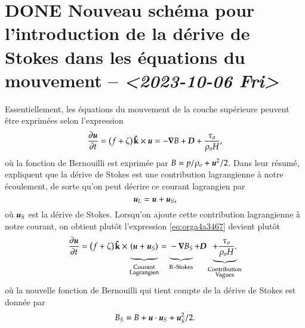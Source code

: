 \documentclass[10pt]{article}
\numberwithin{equation}{section}
\newcommand{\kvf}{\vb{\hat{k}}}
\newcommand{\uu}{\vb*{u}}
\newcommand{\grande}{\vphantom{\frac{1}{xx}}}
\newcommand{\pt}{\hspace{1pt}} %
\begin{document}
\section{{\bfseries\sffamily DONE} Nouveau schéma pour l'introduction de la dérive de Stokes dans les équations du mouvement -- \textit{<2023-10-06 Fri>}}
\label{sec:org2c8da6e}
Essentiellement, les équations du mouvement de la couche supérieure peuvent être exprimées selon l'expression
\begin{equation}
\label{eq:orga4a3467}
   \pdv{\uu}{t} = \qty(f+\zeta)\pt \kvf\times\uu = -\gradient{B} + \boldsymbol{D} + \frac{\tau_a}{\rho_o H},
\end{equation}
où la fonction de Bernouilli est exprimée par \(B = p/\rho_o + \uu^2/2\).
Dans leur résumé,   expliquent que la dérive de Stokes est une contribution lagrangienne à notre écoulement, de sorte qu'on peut décrire ce courant lagrangien par
\begin{equation}
   \uu_L = \uu + \uu_S,
\end{equation}
où \(\uu_S\) est la dérive de Stokes. 
Lorsqu'on ajoute cette contribution lagrangienne à notre courant, on obtient plutôt l'expression \ref{eq:orga4a3467} devient plutôt
\begin{equation}
   \pdv{\uu}{t} = \qty(f+\zeta)\pt \kvf\times\underbrace{\grande\qty(\uu + \uu_S)}_{\substack{\text{Courant} \\ \text{Lagrangien}}} = \underbrace{\grande-\gradient{B_S}}_\text{B.-Stokes} + \boldsymbol{D} \underbrace{+ \frac{\tau_o}{\rho_o H}.}_{\substack{\text{Contribution} \\ \text{Vagues}}}
\end{equation}
où la nouvelle fonction de Bernouilli qui tient compte de la dérive de Stokes est donnée par
\begin{align}
   B_S = B + \uu\cdot\uu_S + \uu_S^2/2.
\end{align}


\end{document}
